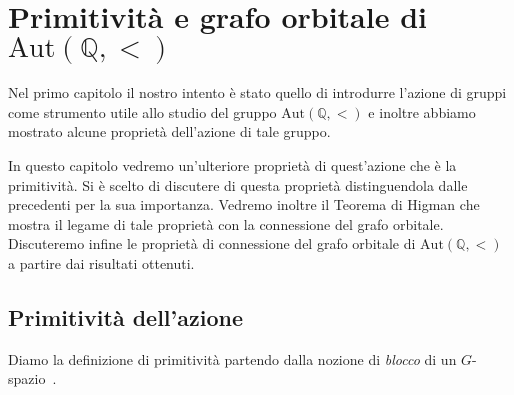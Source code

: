 \documentclass[12pt,a4paper,openright]{report}
\newcommand{\aut}{ \mathrm{Aut} ( \mathbb{Q},< ) } %
\newcommand{\0}{\setminus\{0\}} %
\newcommand{\Gsp}{$G$-spazio~} %
\theoremstyle{definition}
\theoremstyle{plain}
\begin{document}
\chapter{Primitività e grafo orbitale di $\aut$}

Nel primo capitolo il nostro intento è stato quello di introdurre l'azione di gruppi come strumento utile allo studio del gruppo $\aut$ e inoltre abbiamo mostrato alcune proprietà dell'azione di tale gruppo.

In questo capitolo vedremo un'ulteriore proprietà di quest'azione che è la primitività. Si è scelto di discutere di questa proprietà distinguendola dalle precedenti per la sua importanza. Vedremo inoltre il Teorema di Higman che mostra il legame di tale proprietà con la connessione del grafo orbitale. Discuteremo infine le proprietà di connessione del grafo orbitale di $\aut$ a partire dai risultati ottenuti.

\section{Primitività dell'azione}
Diamo la definizione di primitività partendo dalla nozione di \emph{blocco} di un \Gsp.
\end{document}
